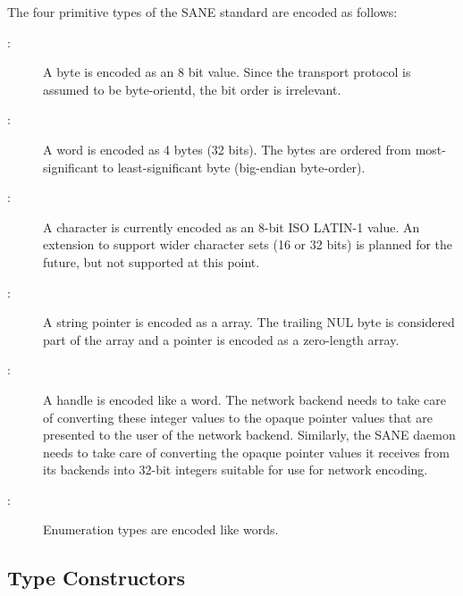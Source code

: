 The four primitive types of the SANE standard are encoded as follows:
\begin{description}

\item[:] A byte is encoded as an 8 bit value.
  Since the transport protocol is assumed to be byte-orientd, the bit
  order is irrelevant.

\item[:] A word is encoded as 4 bytes (32
  bits).  The bytes are ordered from most-significant to
  least-significant byte (big-endian byte-order).

\item[:] A character is currently encoded as an 8-bit
  ISO LATIN-1 value.  An extension to support wider character sets (16 or 32
  bits) is planned for the future, but not supported at this point.

\item[:] A string pointer is encoded as a
   array.  The trailing NUL byte is considered part
  of the array and a  pointer is encoded as a zero-length
  array.
  
\item[:] A handle is encoded like a word.
  The network backend needs to take care of converting these integer
  values to the opaque pointer values that are presented to the user
  of the network backend.  Similarly, the SANE daemon needs to take
  care of converting the opaque pointer values it receives from its
  backends into 32-bit integers suitable for use for network encoding.

\item[{\em{}}:] Enumeration types are encoded
  like words.

\end{description}

\subsection{Type Constructors}

